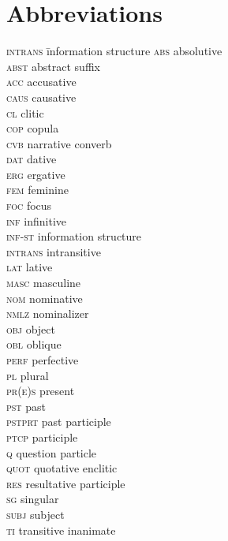 \documentclass[output=paper
,modfonts
,nonflat]{langsci/langscibook}
\begin{document}
\section*{Abbreviations}
\begin{multicols}{2}
\begin{tabbing}
\textsc{intrans}\hspace{5mm} \= information structure\kill
\textsc{abs} \> absolutive\\ 
\textsc{abst} \> abstract suffix\\ 
\textsc{acc} \> accusative\\
\textsc{caus} \> causative\\ 
\textsc{cl} \> clitic\\ 
\textsc{cop} \> copula\\ 
\textsc{cvb} \> narrative converb\\ 
\textsc{dat} \> dative\\ 
\textsc{erg} \> ergative\\ 
\textsc{fem} \> feminine\\ 
\textsc{foc} \> focus\\ 
\textsc{inf} \> infinitive\\ 
\textsc{inf-st} \> information structure\\ 
\textsc{intrans} \> intransitive\\ 
\textsc{lat} \> lative\\ 
\textsc{masc} \> masculine\\ 
\textsc{nom} \> nominative\\ 
\textsc{nmlz} \> nominalizer\\ 
\textsc{obj} \> object\\ 
\textsc{obl} \> oblique\\
\textsc{perf} \> perfective\\
\textsc{pl} \> plural\\ 
\textsc{pr(e)s} \> present\\ 
\textsc{pst} \> past\\ 
\textsc{pstprt} \> past participle\\
\textsc{ptcp} \> participle\\ 
\textsc{q} \> question particle\\ 
\textsc{quot} \> quotative enclitic\\
\textsc{res} \> resultative participle\\ 
\textsc{sg} \> singular\\ 
\textsc{subj} \> subject\\ 
\textsc{ti} \> transitive inanimate
\end{tabbing} 
\end{multicols}
\end{document}

